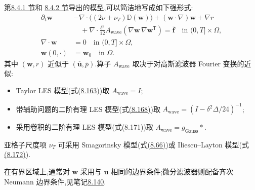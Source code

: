 \begin{note}[基于波数空间近似的模型]
\label{note:les-wave-number-resulting-models}
第\hyperref[subsec:les-large-cross-term-modeling]{8.4.1 节}和
\hyperref[subsec:les-subgrid-term-modeling]{8.4.2 节}导出的模型,可以简洁地写成如下强形式:
\begin{equation}\label{eq:les-wave-number-model}
\begin{aligned}
 \partial_t\bm{w}
 &-\nabla\cdot\bigl((2\nu+\nu_T)\mathbb{D}(\bm{w})\bigr)
  +(\bm{w}\cdot\nabla)\bm{w}
  +\nabla r\\
 &\quad+\nabla\cdot\frac{\delta^2}{12}
   A_{\mathrm{wave}}\!\left(
    \nabla\bm{w}\,
    \nabla\bm{w}^{\mathsf T}\right)
  =\overline{\bm{f}}
  \quad\text{in }(0,T]\times\Omega,\\
 \nabla\cdot\bm{w}&=0
  \quad\text{in }(0,T]\times\Omega,\\
 \bm{w}(0,\cdot)&=\bm{w}_0
  \quad\text{in }\Omega.
\end{aligned}
\end{equation}
其中 $(\bm{w},r)$ 近似于 $(\overline{\bm{u}},\overline{p})$.算子 $A_{\mathrm{wave}}$ 取决于对高斯滤波器 Fourier 变换的近似:
\begin{itemize}
 \item Taylor LES 模型(式\hyperref[eq:taylor-les-large-cross-model]{(8.163)})取 $A_{\mathrm{wave}}=I$;
 \item 带辅助问题的二阶有理 LES 模型(式\hyperref[eq:rational-les-large-cross-model]{(8.168)})取
 $A_{\mathrm{wave}}=\left(I-\delta^2\Delta/24\right)^{-1}$;
 \item 采用卷积的二阶有理 LES 模型(式(8.171))取
 $A_{\mathrm{wave}}=g_{\mathrm{Gauss}}*$.
\end{itemize}
亚格子尺度项 $\nu_T$ 可采用 Smagorinsky 模型(式\hyperref[eq:smagorinsky-turbulent-viscosity]{(8.66)})或 Iliescu--Layton 模型(式\hyperref[eq:iliescu-layton-sgs-model-differential]{(8.172)}).

在有界区域上,通常对 $\bm{w}$ 采用与 $\bm{u}$ 相同的边界条件;微分滤波器则配备齐次 Neumann 边界条件,见笔记\hyperref[note:les-differential-filter-bounded-domain]{8.140}.
\end{note}

